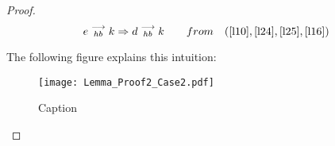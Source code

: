 \begin{proof}
    \[
        e\stackrel{\longrightarrow}{_{hb}}k \Rightarrow d\stackrel{\longrightarrow}{_{hb}}k
        \qquad from \quad
        (\ref{l10}, \ref{l24},  \ref{l25}, \ref{l16})
    \]
    
    The following figure explains this intuition: 
    
    \begin{figure}[H]
        \centering
        \texttt{[image: Lemma\_Proof2\_Case2.pdf]}
        \caption{Caption}
        \label{fig:my_label}
    \end{figure}

\end{proof}

